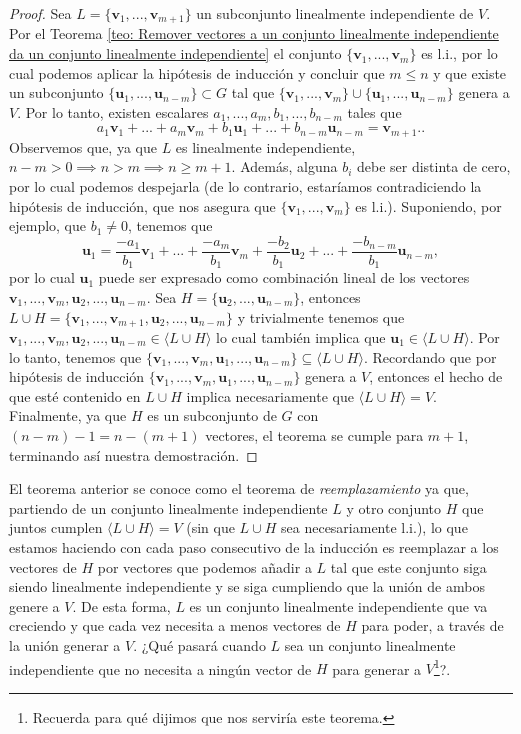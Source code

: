 \documentclass[notasLineal]{subfiles}
\begin{document}
\begin{Teo}
\begin{proof}
    Sea $L=\{\mathbf{v}_1,...,\mathbf{v}_{m+1}\}$ un subconjunto linealmente independiente de $V$. Por el Teorema \ref{teo: Remover vectores a un conjunto linealmente independiente da un conjunto linealmente independiente} el conjunto $\{\mathbf{v}_1,...,\mathbf{v}_m\}$ es l.i., por lo cual podemos aplicar la hipótesis de inducción y concluir que $m\le n$ y que existe un subconjunto $\{\mathbf{u}_1,...,\mathbf{u}_{n-m}\}\subset G$ tal que $\{\mathbf{v}_1,...,\mathbf{v}_m\}\cup\{\mathbf{u}_1,...,\mathbf{u}_{n-m}\}$ genera a $V$. Por lo tanto, existen escalares $a_1,...,a_m,b_1,...,b_{n-m}$ tales que \[
        a_1\mathbf{v}_1+...+a_m\mathbf{v}_m+b_1\mathbf{u}_1+...+b_{n-m}\mathbf{u}_{n-m}=\mathbf{v}_{m+1}.
    .\] 
    Observemos que, ya que $L$ es linealmente independiente, $n-m>0\implies n>m\implies n\ge m+1$. Además, alguna $b_i$ debe ser distinta de cero, por lo cual podemos despejarla (de lo contrario, estaríamos contradiciendo la hipótesis de inducción, que nos asegura que $\{\mathbf{v}_1,...,\mathbf{v}_m\}$ es l.i.). Suponiendo, por ejemplo, que $b_1\neq 0$, tenemos que \[
        \mathbf{u}_1=\frac{-a_1}{b_1}\mathbf{v}_1+...+\frac{-a_m}{b_1}\mathbf{v}_m+\frac{-b_2}{b_1}\mathbf{u}_2+...+\frac{-b_{n-m}}{b_1}\mathbf{u}_{n-m}
    ,\] 
    por lo cual $\mathbf{u}_1$ puede ser expresado como combinación lineal de los vectores $\mathbf{v}_1,...,\mathbf{v}_m,\mathbf{u}_2,...,\mathbf{u}_{n-m}.$ Sea $H=\{\mathbf{u}_2,...,\mathbf{u}_{n-m}\}$, entonces $L\cup H=\{\mathbf{v}_1,...,\mathbf{v}_{m+1},\mathbf{u}_2,...,\mathbf{u}_{n-m}\}$ y trivialmente tenemos que $\mathbf{v}_1,...,\mathbf{v}_m,\mathbf{u}_2,...,\mathbf{u}_{n-m}\in\langle L\cup H\rangle$ \textemdash lo cual también implica que $\mathbf{u}_1\in\langle L\cup H\rangle$. Por lo tanto, tenemos que $\{\mathbf{v}_1,...,\mathbf{v}_m,\mathbf{u}_1,...,\mathbf{u}_{n-m}\}\subseteq\langle L\cup H\rangle.$ Recordando que por hipótesis de inducción $\{\mathbf{v}_1,...,\mathbf{v}_m,\mathbf{u}_1,...,\mathbf{u}_{n-m}\}$ genera a $V$, entonces el hecho de que esté contenido en $L\cup H$ implica necesariamente que $\langle L\cup H\rangle=V.$ Finalmente, ya que $H$ es un subconjunto de $G$ con $(n-m)-1=n-(m+1)$ vectores, el teorema se cumple para $m+1$, terminando así nuestra demostración.
    \end{proof}
\end{Teo}

El teorema anterior se conoce como el teorema de \emph{reemplazamiento} ya que, partiendo de un conjunto linealmente independiente $L$ y otro conjunto $H$ que juntos cumplen $\langle L\cup H \rangle=V$ (sin que $L\cup H$ sea necesariamente l.i.), lo que estamos haciendo con cada paso consecutivo de la inducción es reemplazar a los vectores de $H$ por vectores que podemos añadir a $L$ tal que este conjunto siga siendo linealmente independiente y se siga cumpliendo que la unión de ambos genere a $V$. De esta forma, $L$ es un conjunto linealmente independiente que va creciendo y que cada vez necesita a menos vectores de $H$ para poder, a través de la unión generar a $V$. ¿Qué pasará cuando $L$ sea un conjunto linealmente independiente que no necesita a ningún vector de $H$ para generar a $V$\footnote{Recuerda para qué dijimos que nos serviría este teorema.}?. 
\end{document}
